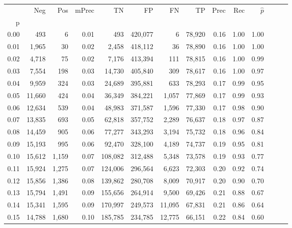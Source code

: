 \begin{tabular}{rrrrrrrrrrrrrr}
\toprule
{} &     Neg &    Pos & mPrec &       TN &       FP &      FN &      TP &  Prec &   Rec & $\hat{p}$ \\
p    &         &        &       &          &          &         &         &       &       &           \\
\midrule
0.00 &     493 &      6 &  0.01 &      493 &  420,077 &       6 &  78,920 &  0.16 &  1.00 &      1.00 \\
0.01 &   1,965 &     30 &  0.02 &    2,458 &  418,112 &      36 &  78,890 &  0.16 &  1.00 &      1.00 \\
0.02 &   4,718 &     75 &  0.02 &    7,176 &  413,394 &     111 &  78,815 &  0.16 &  1.00 &      0.99 \\
0.03 &   7,554 &    198 &  0.03 &   14,730 &  405,840 &     309 &  78,617 &  0.16 &  1.00 &      0.97 \\
0.04 &   9,959 &    324 &  0.03 &   24,689 &  395,881 &     633 &  78,293 &  0.17 &  0.99 &      0.95 \\
0.05 &  11,660 &    424 &  0.04 &   36,349 &  384,221 &   1,057 &  77,869 &  0.17 &  0.99 &      0.93 \\
0.06 &  12,634 &    539 &  0.04 &   48,983 &  371,587 &   1,596 &  77,330 &  0.17 &  0.98 &      0.90 \\
0.07 &  13,835 &    693 &  0.05 &   62,818 &  357,752 &   2,289 &  76,637 &  0.18 &  0.97 &      0.87 \\
0.08 &  14,459 &    905 &  0.06 &   77,277 &  343,293 &   3,194 &  75,732 &  0.18 &  0.96 &      0.84 \\
0.09 &  15,193 &    995 &  0.06 &   92,470 &  328,100 &   4,189 &  74,737 &  0.19 &  0.95 &      0.81 \\
0.10 &  15,612 &  1,159 &  0.07 &  108,082 &  312,488 &   5,348 &  73,578 &  0.19 &  0.93 &      0.77 \\
0.11 &  15,924 &  1,275 &  0.07 &  124,006 &  296,564 &   6,623 &  72,303 &  0.20 &  0.92 &      0.74 \\
0.12 &  15,856 &  1,386 &  0.08 &  139,862 &  280,708 &   8,009 &  70,917 &  0.20 &  0.90 &      0.70 \\
0.13 &  15,794 &  1,491 &  0.09 &  155,656 &  264,914 &   9,500 &  69,426 &  0.21 &  0.88 &      0.67 \\
0.14 &  15,341 &  1,595 &  0.09 &  170,997 &  249,573 &  11,095 &  67,831 &  0.21 &  0.86 &      0.64 \\
0.15 &  14,788 &  1,680 &  0.10 &  185,785 &  234,785 &  12,775 &  66,151 &  0.22 &  0.84 &      0.60 \\

\end{tabular}
